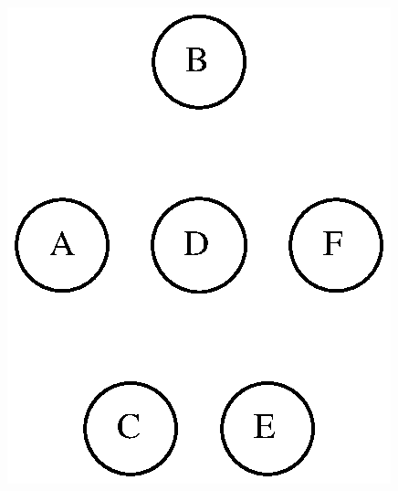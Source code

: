 \documentclass[aspectratio=169]{beamer}
\begin{document}
\begin{frame}[fragile]
\begin{columns}[T]
\begin{column}{0.5\linewidth}
\begin{figure}[h]
	\includegraphics[height=0.4\paperheight]{imagens/arvore_c-passo1.eps}
\end{figure}
\end{column}
\end{columns}
\end{frame}
\end{document}
